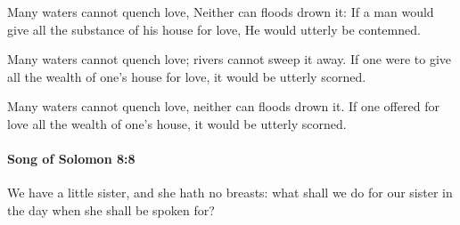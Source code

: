 			\begin{versebox}
					\item[BHS] 
					\item[LXX] 
					\item[ASV] Many waters cannot quench love, Neither can floods drown it: If a man would give all the substance of his house for love, He would utterly be contemned.
					\item[NIV] Many waters cannot quench love; rivers cannot sweep it away. If one were to give all the wealth of one’s house for love, it would be utterly scorned.
					\item[NRSV] Many waters cannot quench love, neither can floods drown it. If one offered for love all the wealth of one’s house, it would be utterly scorned.
			\end{versebox}

		\paragraph{Song of Solomon 8:8} %
			\label{SONGOFSOLOMON-8-8}

			We have a little sister, and she hath no breasts: what shall we do for our sister in the day when she shall be spoken for?

